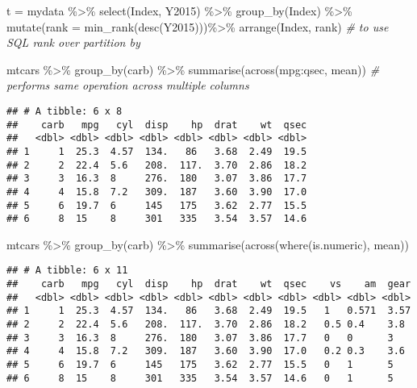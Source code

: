 \documentclass[
]{article}
\newenvironment{Shaded}{\begin{snugshade}}{\end{snugshade}}
\newcommand{\AttributeTok}[1]{\textcolor[rgb]{0.77,0.63,0.00}{#1}}
\newcommand{\CommentTok}[1]{\textcolor[rgb]{0.56,0.35,0.01}{\textit{#1}}}
\newcommand{\FunctionTok}[1]{\textcolor[rgb]{0.00,0.00,0.00}{#1}}
\newcommand{\NormalTok}[1]{#1}
\newcommand{\OtherTok}[1]{\textcolor[rgb]{0.56,0.35,0.01}{#1}}
\newcommand{\SpecialCharTok}[1]{\textcolor[rgb]{0.00,0.00,0.00}{#1}}
\begin{document}
\begin{Shaded}
\begin{Highlighting}[]
\NormalTok{t }\OtherTok{=}\NormalTok{ mydata }\SpecialCharTok{\%\textgreater{}\%} \FunctionTok{select}\NormalTok{(Index, Y2015) }\SpecialCharTok{\%\textgreater{}\%}
  \FunctionTok{group\_by}\NormalTok{(Index) }\SpecialCharTok{\%\textgreater{}\%}
  \FunctionTok{mutate}\NormalTok{(}\AttributeTok{rank =} \FunctionTok{min\_rank}\NormalTok{(}\FunctionTok{desc}\NormalTok{(Y2015)))}\SpecialCharTok{\%\textgreater{}\%} 
  \FunctionTok{arrange}\NormalTok{(Index, rank) }\CommentTok{\# to use SQL rank over partition by}
\end{Highlighting}
\end{Shaded}

\begin{Shaded}
\begin{Highlighting}[]
\NormalTok{mtcars }\SpecialCharTok{\%\textgreater{}\%} 
  \FunctionTok{group\_by}\NormalTok{(carb) }\SpecialCharTok{\%\textgreater{}\%} 
  \FunctionTok{summarise}\NormalTok{(}\FunctionTok{across}\NormalTok{(mpg}\SpecialCharTok{:}\NormalTok{qsec, mean)) }\CommentTok{\# performs same operation across multiple columns}
\end{Highlighting}
\end{Shaded}

\begin{verbatim}
## # A tibble: 6 x 8
##    carb   mpg   cyl  disp    hp  drat    wt  qsec
##   <dbl> <dbl> <dbl> <dbl> <dbl> <dbl> <dbl> <dbl>
## 1     1  25.3  4.57  134.   86   3.68  2.49  19.5
## 2     2  22.4  5.6   208.  117.  3.70  2.86  18.2
## 3     3  16.3  8     276.  180   3.07  3.86  17.7
## 4     4  15.8  7.2   309.  187   3.60  3.90  17.0
## 5     6  19.7  6     145   175   3.62  2.77  15.5
## 6     8  15    8     301   335   3.54  3.57  14.6
\end{verbatim}

\begin{Shaded}
\begin{Highlighting}[]
\NormalTok{mtcars }\SpecialCharTok{\%\textgreater{}\%} 
  \FunctionTok{group\_by}\NormalTok{(carb) }\SpecialCharTok{\%\textgreater{}\%} 
  \FunctionTok{summarise}\NormalTok{(}\FunctionTok{across}\NormalTok{(}\FunctionTok{where}\NormalTok{(is.numeric), mean))  }
\end{Highlighting}
\end{Shaded}

\begin{verbatim}
## # A tibble: 6 x 11
##    carb   mpg   cyl  disp    hp  drat    wt  qsec    vs    am  gear
##   <dbl> <dbl> <dbl> <dbl> <dbl> <dbl> <dbl> <dbl> <dbl> <dbl> <dbl>
## 1     1  25.3  4.57  134.   86   3.68  2.49  19.5   1   0.571  3.57
## 2     2  22.4  5.6   208.  117.  3.70  2.86  18.2   0.5 0.4    3.8 
## 3     3  16.3  8     276.  180   3.07  3.86  17.7   0   0      3   
## 4     4  15.8  7.2   309.  187   3.60  3.90  17.0   0.2 0.3    3.6 
## 5     6  19.7  6     145   175   3.62  2.77  15.5   0   1      5   
## 6     8  15    8     301   335   3.54  3.57  14.6   0   1      5
\end{verbatim}
\end{document}
